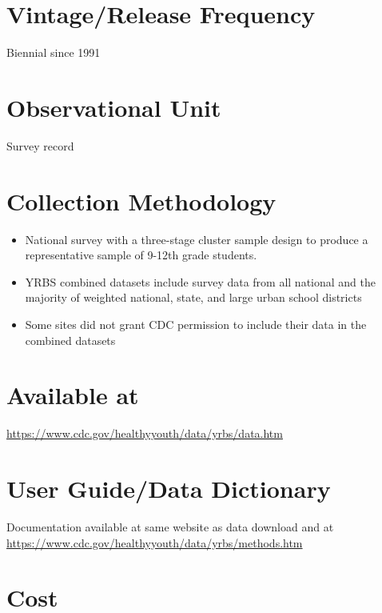 \documentclass[
]{book}
\providecommand{\tightlist}{%
  \setlength{\itemsep}{0pt}\setlength{\parskip}{0pt}}
\begin{document}
\hypertarget{vintagerelease-frequency-98}{%
\section{Vintage/Release Frequency}\label{vintagerelease-frequency-98}}

Biennial since 1991

\hypertarget{observational-unit-98}{%
\section{Observational Unit}\label{observational-unit-98}}

Survey record

\hypertarget{collection-methodology-98}{%
\section{Collection Methodology}\label{collection-methodology-98}}

\begin{itemize}
\tightlist
\item
  National survey with a three-stage cluster sample design to produce a representative sample of 9-12th grade students.
\item
  YRBS combined datasets include survey data from all national and the majority of weighted national, state, and large urban school districts
\item
  Some sites did not grant CDC permission to include their data in the combined datasets
\end{itemize}

\hypertarget{available-at-98}{%
\section{Available at}\label{available-at-98}}

\url{https://www.cdc.gov/healthyyouth/data/yrbs/data.htm}

\hypertarget{user-guidedata-dictionary-98}{%
\section{User Guide/Data Dictionary}\label{user-guidedata-dictionary-98}}

Documentation available at same website as data download and at \url{https://www.cdc.gov/healthyyouth/data/yrbs/methods.htm}

\hypertarget{cost-98}{%
\section{Cost}\label{cost-98}}
\end{document}
